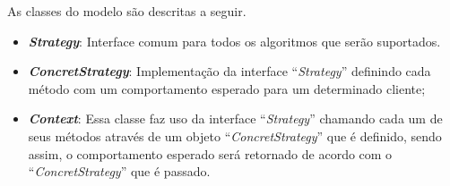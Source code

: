 \begin{apendicesenv}
As classes do modelo são descritas a seguir.

\begin{itemize}
	\item \textbf{\textit{Strategy}}: Interface comum para todos os algoritmos que serão suportados.
	\item \textbf{\textit{ConcretStrategy}}: Implementação da interface ``\textit{Strategy}'' definindo cada método com um comportamento esperado para um determinado cliente;
	\item \textbf{\textit{Context}}: Essa classe faz uso da interface ``\textit{Strategy}'' chamando cada um de seus métodos através de um objeto ``\textit{ConcretStrategy}'' que é definido, sendo assim,  o comportamento esperado será retornado de acordo com o ``\textit{ConcretStrategy}'' que é passado.
\end{itemize}

\end{apendicesenv}
